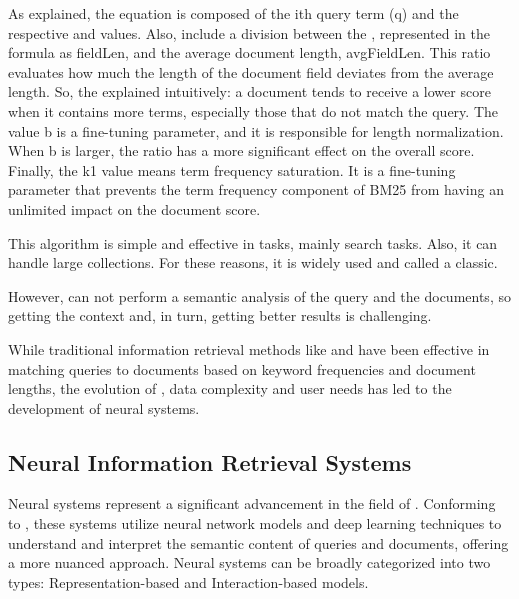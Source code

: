 As \citet{phd_understanding_2023} explained, the {\bm} equation is composed of the ith query term (q) and the respective {\idf} and {\tf} values. Also, include a division between the {\dl}, represented in the formula as fieldLen, and the average document length, avgFieldLen. This ratio evaluates how much the length of the document field deviates from the average length. So, the \citet{noauthor_practical_2018} explained intuitively: a document tends to receive a lower score when it contains more terms, especially those that do not match the query. The value b is a fine-tuning parameter, and it is responsible for length normalization. When b is larger, the ratio has a more significant effect on the overall score. Finally, the k1 value means term frequency saturation. It is a fine-tuning parameter that prevents the term frequency component of BM25 from having an unlimited impact on the document score.

This algorithm is simple and effective in {\ir} tasks, mainly search tasks. Also, it can handle large collections. For these reasons, it is widely used and called a classic.

However, {\bm} can not perform a semantic analysis of the query and the documents, so getting the context and, in turn, getting better results is challenging. 



While traditional information retrieval methods like {\tfidf} and {\bm} have been effective in matching queries to documents based on keyword frequencies and document lengths, the evolution of {\ai}, data complexity and user needs has led to the development of neural {\ir} systems.



\subsection{Neural Information Retrieval Systems}


Neural {\ir} systems represent a significant advancement in the field of {\ir}. Conforming to \citet{mitra_introduction_nodate}, these systems utilize neural network models and deep learning techniques to understand and interpret the semantic content of queries and documents, offering a more nuanced approach. Neural {\ir} systems can be broadly categorized into two types: Representation-based and Interaction-based models.


